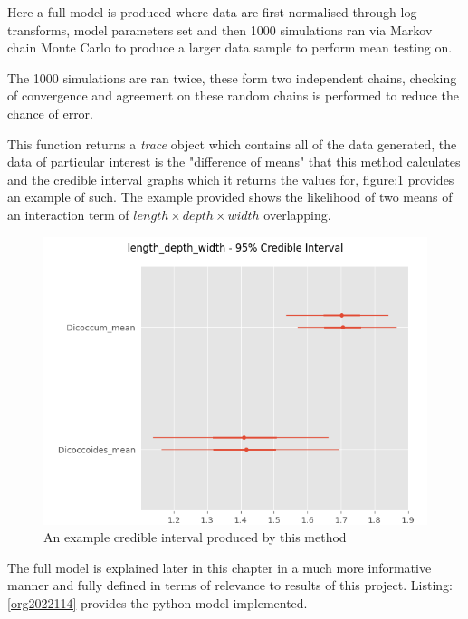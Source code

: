 \documentclass[11pt]{report}
\begin{document}
Here a full model is produced where data are first normalised through log transforms, model parameters set and then 1000 simulations ran via Markov chain Monte Carlo to produce a larger data sample to perform mean testing on.

The 1000 simulations are ran twice, these form two independent chains, checking of convergence and agreement on these random chains is performed to reduce the chance of error.

This function returns a \emph{trace} object which contains all of the data generated, the data of particular interest is the "difference of means" that this method calculates and the credible interval graphs which it returns the values for, figure:\ref{fig:orga97f904} provides an example of such. The example provided shows the likelihood of two means of an interaction term of
\(length \times  depth \times width\) overlapping.

\begin{figure}[htbp]
\centering
\includegraphics[width=15cm]{./images/ci.png}
\caption{\label{fig:orga97f904}
An example credible interval produced by this method}
\end{figure}


The full model is explained later in this chapter in a much more informative manner and fully defined in terms of relevance to results of this project. Listing:\ref{org2022114} provides the python model implemented.
\end{document}
